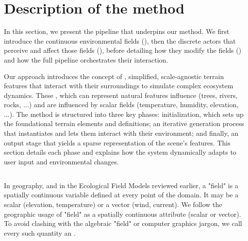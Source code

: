 









\section{Description of the method}
\label{sec:env-obj-pipeline}

In this section, we present the pipeline that underpins our method.
We first introduce the continuous environmental fields (), then the discrete actors that perceive and affect those fields (), before detailing how they modify the fields () and how the full pipeline orchestrates their interaction.

Our approach introduces the concept of , simplified, scale-agnostic terrain features that interact with their surroundings to simulate complex ecosystem dynamics. These , which can represent natural features influence (trees, rivers, rocks, ...) and are influenced by scalar fields (temperature, humidity, elevation, ...). The method is structured into three key phases: initialization, which sets up the foundational terrain elements and  definitions; an iterative generation process that instantiates  and lets them interact with their environment; and finally, an output stage that yields a sparse representation of the scene's features. This section details each phase and explains how the system dynamically adapts to user input and environmental changes.

\subsection{}
\label{sec:env-obj-communication}

In geography, and in the Ecological Field Models reviewed earlier, a "field" is a spatially continuous variable defined at every point of the domain.
It may be a scalar (elevation, temperature) or a vector (wind, current). We follow the geographic usage of "field" as a spatially continuous attribute (scalar or vector). To avoid clashing with the algebraic "field" or computer graphics jargon, we call every such quantity an .

